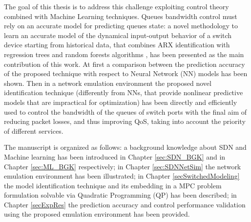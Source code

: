 The goal of this thesis is to address this challenge exploiting control theory combined with Machine Learning techniques. Queues bandwidth control must rely on an accurate model for predicting queues state:
a novel methodology to learn an accurate model of the dynamical input-output behavior of a switch device starting from historical data, that combines ARX identification with regression trees and random forests algorithms \cite{Carner2017, Jain2016, Pasquini2017}, has been presented as the main contribution of this work. At first a comparison between the prediction accuracy of the proposed technique with respect to Neural Network (NN) models has been shown. Then in a network emulation environment the proposed novel identification technique (differently from NNs, that provide nonlinear predictive models that are impractical for optimization) has been directly and efficiently used to control the bandwidth of the queues of switch ports with the final aim of reducing packet losses, and thus improving QoS, taking into account the priority of different services.

The manuscript is organized as follows: a background knowledge about SDN and Machine learning has been introduced in Chapter \ref{sec:SDN_BGK} and in Chapter \ref{sec:ML_BGK} respectively; in Chapter \ref{sec:SDNNetSim} the network emulation environment has been illustrated; in Chapter \ref{secSwitchedModeling} the model identification technique and its embedding in a MPC problem formulation solvable via Quadratic Programming (QP) has been described; in Chapter \ref{secExpRes} the prediction accuracy and control performance validation using the proposed emulation environment has been provided.